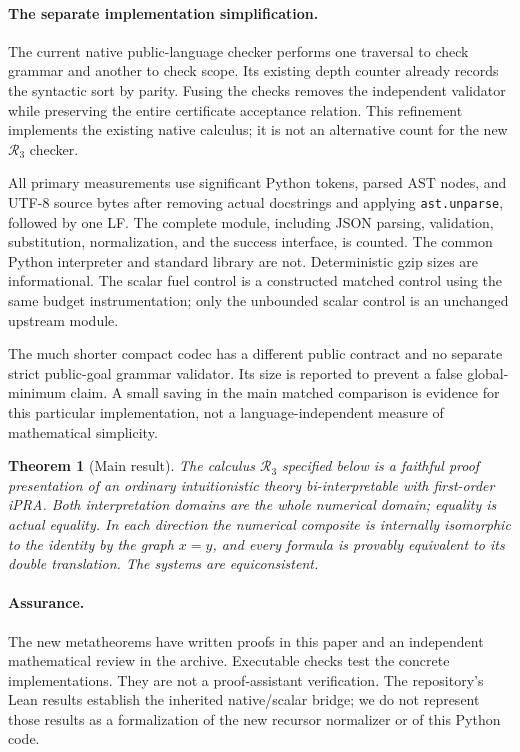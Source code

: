 \documentclass[11pt,letterpaper]{article}
\newtheorem{theorem}{Theorem}[section]
\theoremstyle{definition}\newtheorem{definition}[theorem]{Definition}
\theoremstyle{remark}\newtheorem{remark}[theorem]{Remark}
\newcommand{\RN}{\mathcal R_3}
\begin{document}
\paragraph{The separate implementation simplification.}
The current native public-language checker performs one traversal to
check grammar and another to check scope. Its existing depth counter
already records the syntactic sort by parity. Fusing the checks removes
the independent validator while preserving the entire certificate
acceptance relation. This refinement implements the existing native
calculus; it is not an alternative count for the new $\RN$ checker.



All primary measurements use significant Python tokens, parsed AST nodes,
and UTF-8 source bytes after removing actual docstrings and applying
\texttt{ast.unparse}, followed by one LF. The complete module, including
JSON parsing, validation, substitution, normalization, and the success
interface, is counted. The common Python interpreter and standard
library are not. Deterministic gzip sizes are informational. The scalar
fuel control is a constructed matched control using the same budget
instrumentation; only the unbounded scalar control is an unchanged
upstream module.

The much shorter compact codec has a different public contract and no
separate strict public-goal grammar validator. Its size is reported to
prevent a false global-minimum claim. A small saving in the main matched
comparison is evidence for this particular implementation, not a
language-independent measure of mathematical simplicity.

\begin{theorem}[Main result]\label{thm:main}
The calculus $\RN$ specified below is a faithful proof presentation of an
ordinary intuitionistic theory bi-interpretable with first-order iPRA.
Both interpretation domains are the whole numerical domain; equality
is actual equality. In each direction the numerical composite is
internally isomorphic to the identity by the graph $x=y$, and every
formula is provably equivalent to its double translation. The systems
are equiconsistent.
\end{theorem}

\paragraph{Assurance.}
The new metatheorems have written proofs in this paper and an independent
mathematical review in the archive. Executable checks test the concrete
implementations. They are not a proof-assistant verification. The
repository's Lean results establish the inherited native/scalar bridge;
we do not represent those results as a formalization of the new recursor
normalizer or of this Python code.
\end{document}
